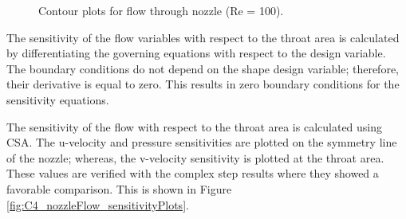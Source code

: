 \begin{figure}[H]
    \centering
    \quad
    \caption{Contour plots for flow through nozzle (Re = 100).}
    \label{fig:C4_nozzleFlow_contourForAnalysis}
\end{figure}

The sensitivity of the flow variables with respect to the throat area is calculated by differentiating the governing equations with respect to the design variable. The boundary conditions do not depend on the shape design variable; therefore, their derivative is equal to zero. This results in zero boundary conditions for the sensitivity equations.

The sensitivity of the flow with respect to the throat area is calculated using CSA. The u-velocity and pressure sensitivities are plotted on the symmetry line of the nozzle; whereas, the v-velocity sensitivity is plotted at the throat area. These values are verified with the complex step results where they showed a favorable comparison. This is shown in Figure \ref{fig:C4_nozzleFlow_sensitivityPlots}.

